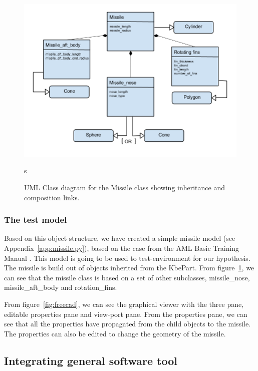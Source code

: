 \begin{figure}[ht!]
\centering
\includegraphics[width=150mm]{gfx/uml_diagram_of_missile.png}

\caption{UML Class diagram for the Missile class showing inheritance and composition links.}s
\label{fig:object_structure}
\end{figure}


\subsubsection{The test model} %
\label{ssub:the_test_model}
Based on this object structure, we have created a simple missile model (see Appendix~\ref{app:missile.py}), based on the case from the AML Basic Training Manual \cite{aml_ref}. This model is going to be used to test-environment for our hypothesis. The missile is build out of objects inherited from the KbePart. From figure~\ref{fig:object_structure}, we can see that the missile class is based on a set of other subclasses, missile\_nose, missile\_aft\_body and rotation\_fins.

From figure~\ref{fig:freecad}, we can see the graphical viewer with the three pane, editable properties pane and view-port pane. From the properties pane, we can see that all the properties have propagated from the child objects to the missile. The properties can also be edited to change the geometry of the missile.


\subsection{Integrating general software tool} %
\label{sub:integrating_general_software_tool}

